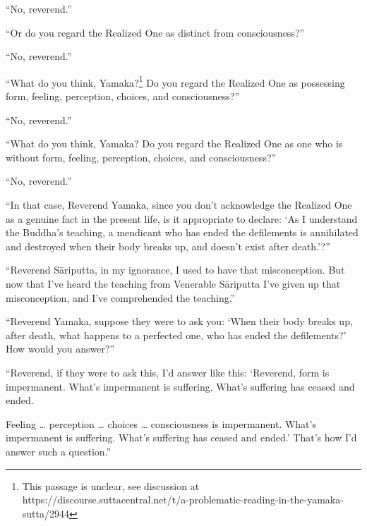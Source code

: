 \documentclass[12pt,openany]{book}%
\begin{document}
“No, reverend.” 

“Or do you regard the Realized One as distinct from consciousness?” 

“No, reverend.” 

“What do you think, Yamaka?\footnote{This passage is unclear, see discussion at https://discourse.suttacentral.net/t/a-problematic-reading-in-the-yamaka-sutta/2944 } Do you regard the Realized One as possessing form, feeling, perception, choices, and consciousness?” 

“No, reverend.” 

“What do you think, Yamaka? Do you regard the Realized One as one who is without form, feeling, perception, choices, and consciousness?” 

“No, reverend.” 

“In that case, Reverend Yamaka, since you don’t acknowledge the Realized One as a genuine fact in the present life, is it appropriate to declare: ‘As I understand the Buddha’s teaching, a mendicant who has ended the defilements is annihilated and destroyed when their body breaks up, and doesn’t exist after death.’?” 

“Reverend \textsanskrit{Sāriputta}, in my ignorance, I used to have that misconception. But now that I’ve heard the teaching from Venerable \textsanskrit{Sāriputta} I’ve given up that misconception, and I’ve comprehended the teaching.” 

“Reverend Yamaka, suppose they were to ask you: ‘When their body breaks up, after death, what happens to a perfected one, who has ended the defilements?’ How would you answer?” 

“Reverend, if they were to ask this, I’d answer like this: ‘Reverend, form is impermanent. What’s impermanent is suffering. What’s suffering has ceased and ended. 

Feeling … perception … choices … consciousness is impermanent. What’s impermanent is suffering. What’s suffering has ceased and ended.’ That’s how I’d answer such a question.” 
\end{document}
